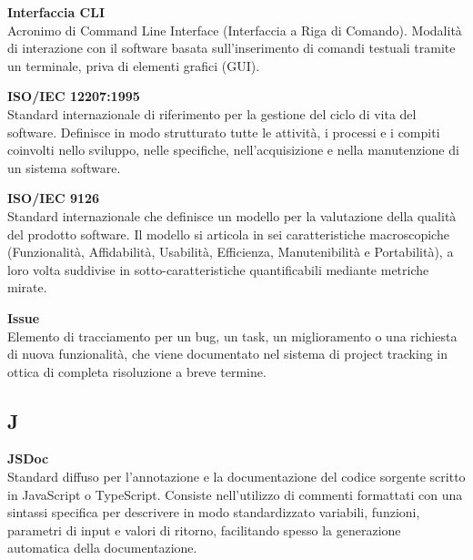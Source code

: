 \documentclass[12pt, a4paper]{article}
\begin{document}
\noindent\hypertarget{interfaccia-cli}{\textbf{Interfaccia CLI}} \\[0.1em]
Acronimo di Command Line Interface (Interfaccia a Riga di Comando). Modalità di interazione con il software basata sull'inserimento di comandi testuali tramite un terminale, priva di elementi grafici (GUI).
\vspace{0.5cm}

\noindent\hypertarget{iso-iec-12207-1995}{\textbf{ISO/IEC 12207:1995}} \\[0.1em]
Standard internazionale di riferimento per la gestione del ciclo di vita del software. Definisce in modo strutturato tutte le attività, i processi e i compiti coinvolti nello sviluppo, nelle specifiche, nell'acquisizione e nella manutenzione di un sistema software.
\vspace{0.5cm}

\noindent\hypertarget{iso-iec-9126}{\textbf{ISO/IEC 9126}} \\[0.1em]
Standard internazionale che definisce un modello per la valutazione della qualità del prodotto software. Il modello si articola in sei caratteristiche macroscopiche (Funzionalità, Affidabilità, Usabilità, Efficienza, Manutenibilità e Portabilità), a loro volta suddivise in sotto-caratteristiche quantificabili mediante metriche mirate.
\vspace{0.5cm}

\noindent\hypertarget{issue}{\textbf{Issue}} \\[0.1em]
Elemento di tracciamento per un bug, un task, un miglioramento o una richiesta di nuova funzionalità, che viene documentato nel sistema di project tracking in ottica di completa risoluzione a breve termine.
\vspace{0.1cm}

\newpage
\subsection*{J}
{}
\vspace{0.2cm}

\noindent\hypertarget{jsdoc}{\textbf{JSDoc}} \\[0.1em]
Standard diffuso per l'annotazione e la documentazione del codice sorgente scritto in JavaScript o TypeScript. Consiste nell'utilizzo di commenti formattati con una sintassi specifica per descrivere in modo standardizzato variabili, funzioni, parametri di input e valori di ritorno, facilitando spesso la generazione automatica della documentazione.
\vspace{0.5cm}
\end{document}
